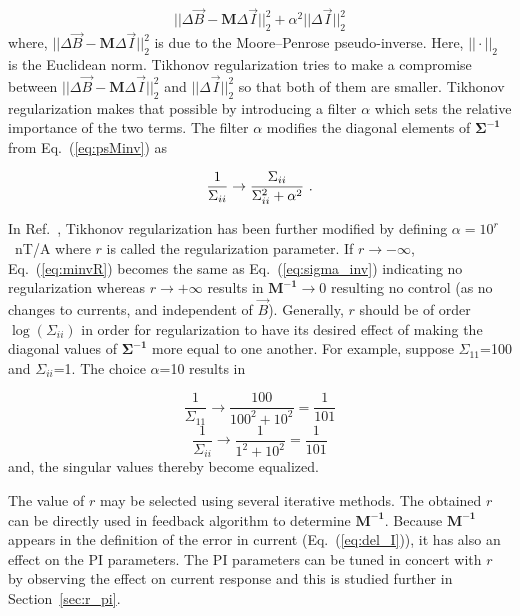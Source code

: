 \begin{equation}\label{eq:tikhonov}
    ||\Delta\Vec{B}-\bm{M}\Delta\Vec{I}||_2^2+{\alpha}^2||\Delta\Vec{I}||_2^2
\end{equation}
where,  $||\Delta\Vec{B}-\bm{M}\Delta\Vec{I}||_2^2$ is due to the Moore--Penrose pseudo-inverse. Here, $||\cdot ||_2$ is the Euclidean norm. Tikhonov regularization tries to make a compromise between $||\Delta\Vec{B}-\bm{M}\Delta\Vec{I}||_2^2$ and $||\Delta\Vec{I}||_2^2$ so that both of them are smaller. Tikhonov regularization makes that possible by introducing a filter $\alpha$ which sets the relative importance of the two terms. The filter $\alpha$ modifies the diagonal elements of $\bm{\Sigma^{-1}}$ from Eq.~(\ref{eq:psMinv}) as

\begin{equation}\label{eq:minvR}
    \frac{1}{\Sigma_{ii}} \rightarrow \frac{\Sigma_{ii}}{\Sigma_{ii}^2+\alpha^2}~{\rm .}
\end{equation}

In Ref.~\cite{bea}, Tikhonov regularization has been further modified by defining $\alpha=10^r$~nT/A where $r$ is called the regularization parameter. If  $r \rightarrow - \infty$, Eq.~(\ref{eq:minvR}) becomes the same as Eq.~(\ref{eq:sigma_inv}) indicating no regularization whereas $r \rightarrow + \infty$ results in $\bm{M^{-1}} \rightarrow 0$ resulting no control (as no changes to currents, and independent of $\Vec{B}$). Generally, $r$ should be of order $\log(\Sigma_{ii})$ in order for regularization to have its desired effect of making the diagonal values of $\bm{\Sigma^{-1}}$ more equal to one another. For example, suppose $\Sigma_{11}$=100 and $\Sigma_{ii}$=1. The choice $\alpha$=10 results in

\begin{equation*}
    \frac{1}{\Sigma_{11}} \rightarrow \frac{100}{100^2+10^2}=\frac{1}{101} 
\end{equation*}
\begin{equation*}
    \frac{1}{\Sigma_{ii}} \rightarrow \frac{1}{1^2+10^2}=\frac{1}{101} 
\end{equation*}
and, the singular values thereby become equalized.

The value of $r$ may be selected using several iterative methods. The obtained $r$ can be directly used in feedback algorithm to determine $\bm{M^{-1}}$. Because $\bm{M^{-1}}$ appears in the definition of the error in current (Eq.~(\ref{eq:del_I})), it has also an effect on the PI parameters. The PI parameters can be tuned in concert with $r$ by observing the effect on current response and this is studied further in Section~\ref{sec:r_pi}.


